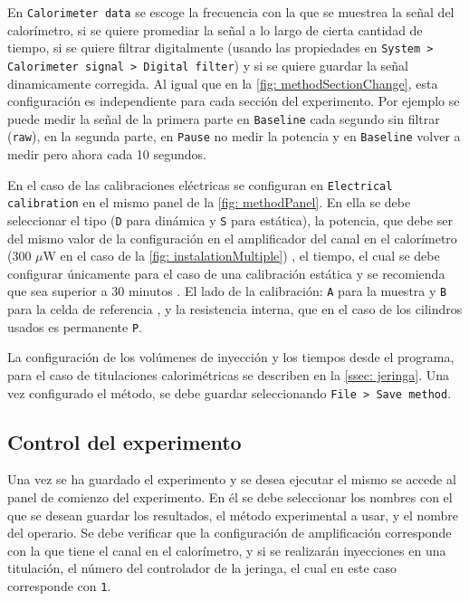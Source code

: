 	En \texttt{Calorimeter data} se escoge la frecuencia con la que se muestrea la se\~nal del calor\'imetro, si se quiere promediar la se\~nal a lo largo de cierta cantidad de tiempo, si se quiere filtrar digitalmente (usando las propiedades en \texttt{System > Calorimeter signal > Digital filter}) y si se quiere guardar la se\~nal dinamicamente corregida. Al igual que en la \autoref{fig: methodSectionChange}, esta configuraci\'on es independiente para cada secci\'on del experimento. Por ejemplo se puede medir la se\~nal de la primera parte en \texttt{Baseline} cada segundo sin filtrar (\texttt{raw}), en la segunda parte, en \texttt{Pause} no medir la potencia y en \texttt{Baseline} volver a medir pero ahora cada 10 segundos.
	
	En el caso de las calibraciones el\'ectricas se configuran en \texttt{Electrical calibration} en el mismo panel de la \autoref{fig: methodPanel}. En ella se debe seleccionar el tipo (\texttt{D} para din\'amica y \texttt{S} para est\'atica), la potencia, que debe ser del mismo valor de la configuraci\'on en el amplificador del canal en el calor\'imetro (300 $\mu$W en el caso de la \autoref{fig: instalationMultiple}) \cite{Suurkuusk}, el tiempo, el cual se debe configurar \'unicamente para el caso de una calibraci\'on est\'atica y se recomienda que sea superior a 30 minutos \cite{Suurkuusk}. El lado de la calibraci\'on: \texttt{A} para la muestra y \texttt{B} para la celda de referencia \cite{Suurkuusk}, y la resistencia interna, que en el caso de los cilindros usados es permanente \texttt{P}.
	
	La configuraci\'on de los vol\'umenes de inyecci\'on y los tiempos desde el programa, para el caso de titulaciones calorimétricas se describen en la \autoref{ssec: jeringa}. Una vez configurado el método, se debe guardar seleccionando \texttt{File > Save method}.
	
	\subsection{Control del experimento}
	Una vez se ha guardado el experimento y se desea ejecutar el mismo se accede al panel de comienzo del experimento. En \'el se debe seleccionar los nombres con el que se desean guardar los resultados, el m\'etodo experimental a usar, y el nombre del operario. Se debe verificar que la configuraci\'on de amplificaci\'on corresponde con la que tiene el canal en el calor\'imetro, y si se realizar\'an inyecciones en una titulaci\'on, el n\'umero del controlador de la jeringa, el cual en este caso corresponde con \texttt{1}.
	
